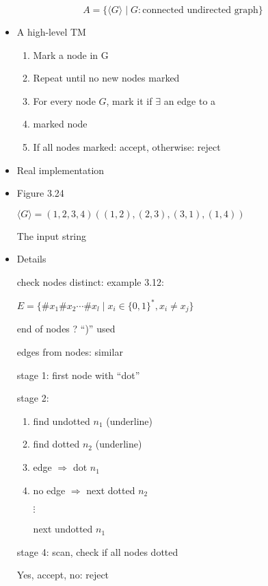 \begin{frame}[allowframebreaks]
  \begin{equation*}
  A=
\{\langle  G\rangle \mid G:\mbox{connected undirected graph}\}
\end{equation*}
  \begin{itemize}
\item A high-level TM
  \begin{enumerate}
  \item Mark a node in G
  \item Repeat until no new nodes marked
  \item [] \label{item:1}\qquad For every node $G$, mark it if $\exists$ an edge
to a 
\item [] \qquad marked node
\item If all nodes marked: accept, otherwise: reject
  \end{enumerate}

\item Real implementation

\item [] Figure 3.24

  \begin{center}
\end{center}


$\langle  G\rangle=(1,2,3,4)((1,2),(2,3),(3,1),(1,4))$

The input string
\item Details

check nodes distinct: example 3.12:

$E=\{\#x_1\# x_2 \cdots \# x_l\mid x_i \in 
\{0,1\}^*, x_i \neq x_j\}$

end of nodes ? ``)'' used

edges from nodes: similar

stage 1: first node with ``dot''

stage 2: 
\begin{enumerate}
\item find undotted $n_1$ (underline)
\item find dotted $n_2$ (underline)
\item edge $\Rightarrow $ dot $n_1$
\item no edge $\Rightarrow$ next dotted $n_2$

$\vdots$

next undotted $n_1$
\end{enumerate}

stage 4:  scan, check if all nodes dotted

Yes, accept, no: reject

\end{itemize}\end{frame} 



